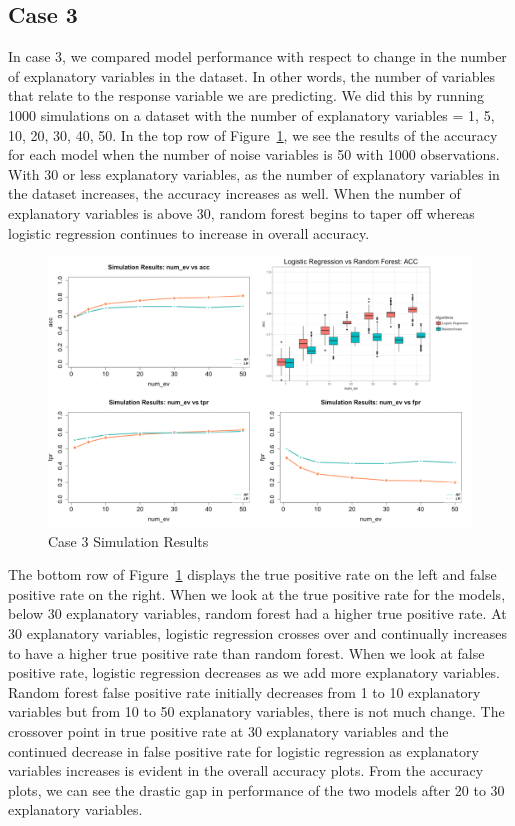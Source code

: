 \documentclass{llncs}
\begin{document}
\subsection{Case 3}

In case 3, we compared model performance with respect to change in the number of explanatory variables in the dataset.  In other words, the number of variables that relate to the response variable we are predicting. We did this by running 1000 simulations on a dataset with the number of explanatory variables = 1, 5, 10, 20, 30, 40, 50.  In the top row of Figure~\ref{fig:case3results}, we see the results of the accuracy for each model when the number of noise variables is 50 with 1000 observations.  With 30 or less explanatory variables, as the number of explanatory variables in the dataset increases, the accuracy increases as well.  When the number of explanatory variables is above 30, random forest begins to taper off whereas logistic regression continues to increase in overall accuracy. 

\begin{figure}
\centering
\includegraphics[scale=0.55]{case3.png}
\caption{Case 3 Simulation Results}
\label{fig:case3results}
\end{figure}

The bottom row of Figure~\ref{fig:case3results} displays the true positive rate on the left and false positive rate on the right.  When we look at the true positive rate for the models, below 30 explanatory variables, random forest had a higher true positive rate.  At 30 explanatory variables, logistic regression crosses over and continually increases to have a higher true positive rate than random forest.  When we look at false positive rate, logistic regression decreases as we add more explanatory variables.  Random forest false positive rate initially decreases from 1 to 10 explanatory variables but from 10 to 50 explanatory variables, there is not much change.  The crossover point in true positive rate at 30 explanatory variables and the continued decrease in false positive rate for logistic regression as explanatory variables increases is evident in the overall accuracy plots.  From the accuracy plots, we can see the drastic gap in performance of the two models after 20 to 30 explanatory variables.
\end{document}
